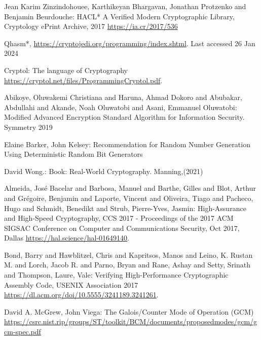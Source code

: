 \documentclass[runningheads]{llncs}
\begin{document}
%
%
% 
% 
%
\newpage
\begin{thebibliography}{8}
Jean Karim Zinzindohouee, Karthikeyan Bhargavan, Jonathan Protzenko and Benjamin Beurdouche: HACL* A Verified Modern Cryptographic Library, Cryptology ePrint Archive, 2017 \url{https://ia.cr/2017/536}

Qhasm*, \url{https://cryptojedi.org/programming/index.shtml}. Last accessed 26 Jan 2024

Cryptol: The language of Cryptography \url{https://cryptol.net/files/ProgrammingCryptol.pdf}.

Abikoye, Oluwakemi Christiana and Haruna, Ahmad Dokoro and Abubakar, Abdullahi and Akande, Noah Oluwatobi and Asani, Emmanuel Oluwatobi: Modified Advanced Encryption Standard Algorithm for Information Security. Symmetry 2019 

Elaine Barker, John Kelsey: Recommendation for Random Number Generation Using Deterministic Random Bit Generators

David Wong.: Book: Real-World Cryptography. Manning,(2021)

Almeida, Jos{\'e} Bacelar and Barbosa, Manuel and Barthe, Gilles and Blot, Arthur and Gr{\'e}goire, Benjamin and Laporte, Vincent and Oliveira, Tiago and Pacheco, Hugo and Schmidt, Benedikt and Strub, Pierre-Yves, Jasmin: High-Assurance and High-Speed Cryptography, CCS 2017 - Proceedings of the 2017 ACM SIGSAC Conference on Computer and Communications Security, Oct 2017, Dallas \url{https://hal.science/hal-01649140}.

Bond, Barry and Hawblitzel, Chris and Kapritsos, Manos and Leino, K. Rustan M. and Lorch, Jacob R. and Parno, Bryan and Rane, Ashay and Setty, Srinath and Thompson, Laure, Vale: Verifying High-Performance Cryptographic Assembly Code, USENIX Association 2017 \url{https://dl.acm.org/doi/10.5555/3241189.3241261}.

David A. McGrew, John Viega: The Galois/Counter Mode of Operation (GCM) \url{https://csrc.nist.rip/groups/ST/toolkit/BCM/documents/proposedmodes/gcm/gcm-spec.pdf}


\end{thebibliography}
\end{document}
